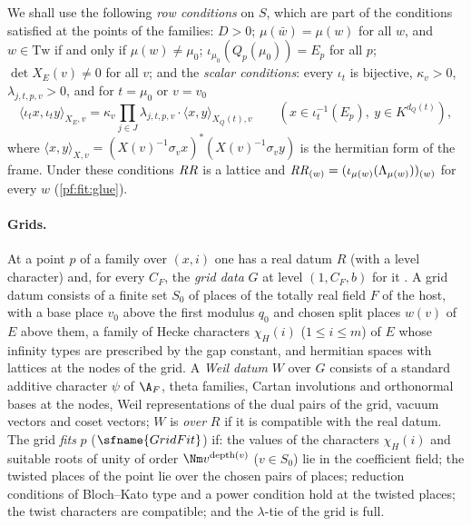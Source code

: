 We shall use the following \emph{row conditions} on $S$, which are part of the conditions satisfied at the points of the
families: $D>0$; $\mu(\bar w)=\mu(w)$ for all $w$, and $w\in\mathrm{Tw}$ if and only if $\mu(w)\ne\mu_0$;
$\iota_{\mu_0}(Q_p(\mu_0))=E_p$ for all $p$; $\det X_E(v)\ne0$ for all $v$; and the \emph{scalar conditions}: every
$\iota_t$ is bijective, $\kappa_v>0$, $\lambda_{j,t,p,v}>0$, and for $t=\mu_0$ or $v=v_0$
\begin{equation}\label{eq:pf:fit:scalar}
\langle\iota_tx,\iota_ty\rangle_{X_E,v}=\kappa_v\prod_{j\in J}\lambda_{j,t,p,v}\cdot\langle x,y\rangle_{X_Q(t),v}
\qquad(x\in\iota_t^{-1}(E_p),\ y\in K^{d_Q(t)}),
\end{equation}
where $\langle x,y\rangle_{X,v}=(X(v)^{-1}\sigma_v x)^*(X(v)^{-1}\sigma_vy)$ is the hermitian form of the frame. Under
these conditions $\mathit{RR}$ is a lattice and $\mathit{RR}_{(w)}=(\iota_{\mu(w)}(\Lambda_{\mu(w)}))_{(w)}$ for every $w$
(\cref{pf:fit:glue}).

\paragraph{Grids.}
At a point $p$ of a family over $(x,i)$ one has a real datum $R$ (with a level character) and, for every $C_F$, the
\emph{grid data} $G$ at level $(1,C_F,b)$ for it \cite{LeanSource2026}. A grid datum consists of a finite set $S_0$ of
places of the totally real field $F$ of the host, with a base place $v_0$ above the first modulus $q_0$ and chosen
split places $w(v)$ of $E$ above them, a family of Hecke characters $\chi_H(i)$ ($1\le i\le m$) of $E$ whose infinity
types are prescribed by the gap constant, and hermitian spaces with lattices at the nodes of the grid. A \emph{Weil
datum} $W$ over $G$ consists of a standard additive character $\psi$ of $\A_F$, theta families, Cartan involutions and
orthonormal bases at the nodes, Weil representations of the dual pairs of the grid, vacuum vectors and coset
vectors; $W$ is \emph{over} $R$ if it is compatible with the real datum. The grid \emph{fits} $p$ ($\sfname{GridFit}$)
if: the values of the characters $\chi_H(i)$ and suitable roots of unity of order $\Nm v^{\mathrm{depth}(v)}$
($v\in S_0$) lie in the coefficient field; the twisted places of the point lie over the chosen pairs of places;
reduction conditions of Bloch--Kato type and a power condition hold at the twisted places; the twist characters are
compatible; and the $\lambda$-tie of the grid is full.

